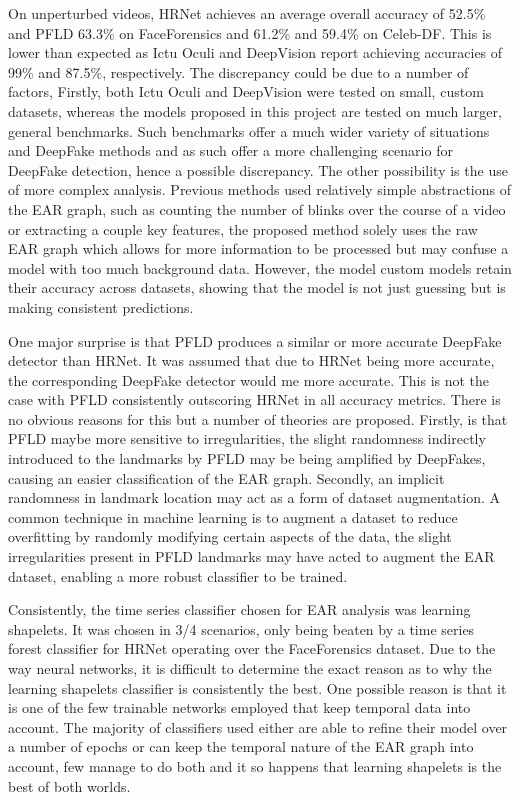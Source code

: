 On unperturbed videos, HRNet achieves an average overall accuracy of 52.5\% and PFLD 63.3\% on FaceForensics and 61.2\% and 59.4\% on Celeb-DF. This is lower than expected as Ictu Oculi and DeepVision report achieving accuracies of 99\%\cite{li2018ictu} and 87.5\%\cite{jung2020deepvision}, respectively. The discrepancy could be due to a number of factors, Firstly, both Ictu Oculi and DeepVision were tested on small, custom datasets, whereas the models proposed in this project are tested on much larger, general benchmarks. Such benchmarks offer a much wider variety of situations and DeepFake methods and as such offer a more challenging scenario for DeepFake detection, hence a possible discrepancy. The other possibility is the use of more complex analysis. Previous methods used relatively simple abstractions of the EAR graph, such as counting the number of blinks over the course of a video or extracting a couple key features, the proposed method solely uses the raw EAR graph which allows for more information to be processed but may confuse a model with too much background data. However, the model custom models retain their accuracy across datasets, showing that the model is not just guessing but is making consistent predictions.

One major surprise is that PFLD produces a similar or more accurate DeepFake detector than HRNet. It was assumed that due to HRNet being more accurate, the corresponding DeepFake detector would me more accurate. This is not the case with PFLD consistently outscoring HRNet in all accuracy metrics. There is no obvious reasons for this but a number of theories are proposed. Firstly, is that PFLD maybe more sensitive to irregularities, the slight randomness indirectly introduced to the landmarks by PFLD may be being amplified by DeepFakes, causing an easier classification of the EAR graph. Secondly, an implicit randomness in landmark location may act as a form of dataset augmentation. A common technique in machine learning is to augment a dataset to reduce overfitting by randomly modifying certain aspects of the data, the slight irregularities present in PFLD landmarks may have acted to augment the EAR dataset, enabling a more robust classifier to be trained.

Consistently, the time series classifier chosen for EAR analysis was learning shapelets. It was chosen in 3/4 scenarios, only being beaten by a time series forest classifier for HRNet operating over the FaceForensics dataset. Due to the way neural networks, it is difficult to determine the exact reason as to why the learning shapelets classifier is consistently the best. One possible reason is that it is one of the few trainable networks employed that keep temporal data into account. The majority of classifiers used either are able to refine their model over a number of epochs or can keep the temporal nature of the EAR graph into account, few manage to do both and it so happens that learning shapelets is the best of both worlds.

